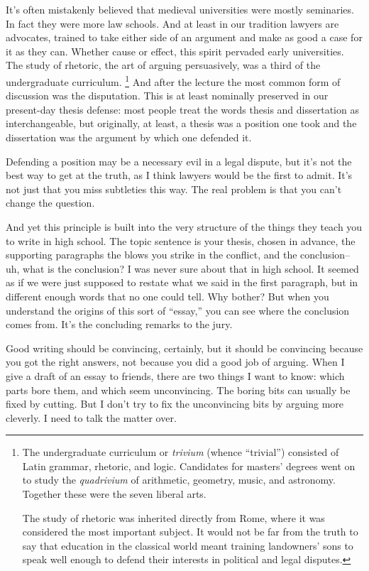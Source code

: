 \documentclass[12pt]{book}
\begin{document}
It's often mistakenly believed that medieval universities were mostly
seminaries. In fact they were more law schools. And at least in our
tradition lawyers are advocates, trained to take either side of an
argument and make as good a case for it as they can. Whether cause or
effect, this spirit pervaded early universities. The study of rhetoric,
the art of arguing persuasively, was a third of the undergraduate
curriculum. \footnote{The undergraduate curriculum or \emph{trivium} (whence
``trivial'') consisted of Latin grammar, rhetoric, and logic. Candidates
for masters' degrees went on to study the \emph{quadrivium} of
arithmetic, geometry, music, and astronomy. Together these were the
seven liberal arts.

The study of rhetoric was inherited directly from Rome, where it was
considered the most important subject. It would not be far from the
truth to say that education in the classical world meant training
landowners' sons to speak well enough to defend their interests in
political and legal disputes.} And after the lecture the most common form of
discussion was the disputation. This is at least nominally preserved in
our present-day thesis defense: most people treat the words thesis and
dissertation as interchangeable, but originally, at least, a thesis was
a position one took and the dissertation was the argument by which one
defended it.

Defending a position may be a necessary evil in a legal dispute, but
it's not the best way to get at the truth, as I think lawyers would be
the first to admit. It's not just that you miss subtleties this way. The
real problem is that you can't change the question.

And yet this principle is built into the very structure of the things
they teach you to write in high school. The topic sentence is your
thesis, chosen in advance, the supporting paragraphs the blows you
strike in the conflict, and the conclusion-- uh, what is the conclusion?
I was never sure about that in high school. It seemed as if we were just
supposed to restate what we said in the first paragraph, but in
different enough words that no one could tell. Why bother? But when you
understand the origins of this sort of ``essay,'' you can see where the
conclusion comes from. It's the concluding remarks to the jury.

Good writing should be convincing, certainly, but it should be
convincing because you got the right answers, not because you did a good
job of arguing. When I give a draft of an essay to friends, there are
two things I want to know: which parts bore them, and which seem
unconvincing. The boring bits can usually be fixed by cutting. But I
don't try to fix the unconvincing bits by arguing more cleverly. I need
to talk the matter over.
\end{document}
